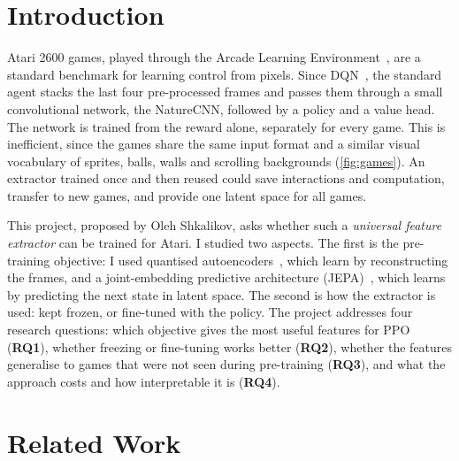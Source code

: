\documentclass[runningheads]{llncs}
\begin{document}
\section{Introduction}
\label{sec:intro}

Atari 2600 games, played through the Arcade Learning Environment~\cite{machado2018revisiting},
are a standard benchmark for learning control from pixels. Since
DQN~\cite{mnih2015human}, the standard agent stacks the last four pre-processed frames and
passes them through a small convolutional network, the NatureCNN, followed by a policy and a
value head. The network is trained from the reward alone, separately for every game. This is
inefficient, since the games share the same input
format and a similar visual vocabulary of sprites, balls, walls and scrolling backgrounds
(\cref{fig:games}). An extractor trained once and then reused could save interactions and computation,
transfer to new games, and provide one latent space for all games.

This project, proposed by Oleh Shkalikov, asks whether such a \emph{universal feature
extractor} can be trained for Atari. I studied two aspects. The first is the pre-training objective: I used quantised
autoencoders~\cite{vandenoord2017vqvae,mentzer2024fsq}, which learn by reconstructing the
frames, and a joint-embedding predictive architecture
(JEPA)~\cite{lecun2022path,assran2023ijepa,bardes2024vjepa}, which learns by predicting the
next state in latent space. The second is how the extractor is used: kept frozen, or fine-tuned with the policy. The
project addresses four research questions: which objective gives the most useful features for PPO (\textbf{RQ1}), whether
freezing or fine-tuning works better (\textbf{RQ2}), whether the features generalise to games
that were not seen during pre-training (\textbf{RQ3}), and what the approach costs and
how interpretable it is (\textbf{RQ4}).

\section{Related Work}
\label{sec:related}
\end{document}
